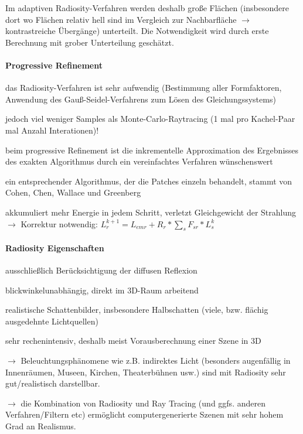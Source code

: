 \documentclass[landscape]{article}
\begin{document}
\begin{multicols}{3}
  Im adaptiven Radiosity-Verfahren werden deshalb große Flächen (insbesondere dort wo Flächen relativ hell sind im Vergleich zur Nachbarfläche $\rightarrow$ kontrastreiche Übergänge) unterteilt. Die Notwendigkeit wird durch erste Berechnung mit grober Unterteilung geschätzt.
  
  \paragraph{Progressive Refinement}
  \begin{itemize*}
    \item das Radiosity-Verfahren ist sehr aufwendig (Bestimmung aller Formfaktoren, Anwendung des Gauß-Seidel-Verfahrens zum Lösen des Gleichungssystems)
    \item jedoch viel weniger Samples als Monte-Carlo-Raytracing (1 mal pro Kachel-Paar mal Anzahl Interationen)!
    \item beim progressive Refinement ist die inkrementelle Approximation des Ergebnisses des exakten Algorithmus durch ein vereinfachtes Verfahren wünschenswert
    \item ein entsprechender Algorithmus, der die Patches einzeln behandelt, stammt von Cohen, Chen, Wallace und Greenberg
    \item akkumuliert mehr Energie in jedem Schritt, verletzt Gleichgewicht der Strahlung $\rightarrow$ Korrektur notwendig:
          $L_r^{k+1}=L_{emr} + R_r*\sum_s F_{sr}* L_s^k$
  \end{itemize*}
  
  
  \paragraph{Radiosity Eigenschaften}
  \begin{itemize*}
    \item ausschließlich Berücksichtigung der diffusen Reflexion
    \item blickwinkelunabhängig, direkt im 3D-Raum arbeitend
    \item realistische Schattenbilder, insbesondere Halbschatten (viele, bzw. flächig ausgedehnte Lichtquellen)
    \item sehr rechenintensiv, deshalb meist Vorausberechnung einer Szene in 3D
    \item $\rightarrow$ Beleuchtungsphänomene wie z.B. indirektes Licht (besonders augenfällig in Innenräumen, Museen, Kirchen, Theaterbühnen usw.) sind mit Radiosity sehr gut/realistisch darstellbar.
    \item $\rightarrow$ die Kombination von Radiosity und Ray Tracing (und ggfs. anderen Verfahren/Filtern etc) ermöglicht computergenerierte Szenen mit sehr hohem Grad an Realismus.
  \end{itemize*}
  

\end{multicols}
\end{document}
